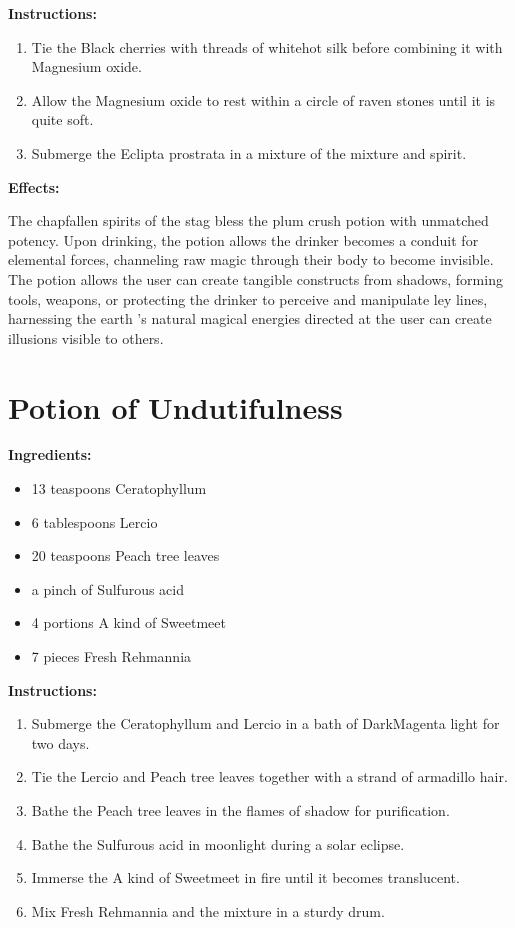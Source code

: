 \documentclass{article}
\begin{document}
\textbf{Instructions:}

\begin{enumerate}
  \item Tie the Black cherries with threads of whitehot silk before combining it with Magnesium oxide.
  \item Allow the Magnesium oxide to rest within a circle of raven stones until it is quite soft.
  \item Submerge the Eclipta prostrata in a mixture of the mixture and spirit.
\end{enumerate}

\textbf{Effects:}

The chapfallen spirits of the stag bless the plum crush potion with unmatched potency. Upon drinking, the potion allows the drinker becomes a conduit for elemental forces, channeling raw magic through their body to become invisible. The potion allows the user can create tangible constructs from shadows, forming tools, weapons, or protecting the drinker to perceive and manipulate ley lines, harnessing the earth 's natural magical energies directed at the user can create illusions visible to others.

\newpage
\section*{Potion of Undutifulness}

\textbf{Ingredients:}

\begin{itemize}
  \item 13 teaspoons Ceratophyllum
  \item 6 tablespoons Lercio
  \item 20 teaspoons Peach tree leaves
  \item a pinch of Sulfurous acid
  \item 4 portions A kind of Sweetmeet
  \item 7 pieces Fresh Rehmannia
\end{itemize}

\textbf{Instructions:}

\begin{enumerate}
  \item Submerge the Ceratophyllum and Lercio in a bath of DarkMagenta light for two days.
  \item Tie the Lercio and Peach tree leaves together with a strand of armadillo hair.
  \item Bathe the Peach tree leaves in the flames of shadow for purification.
  \item Bathe the Sulfurous acid in moonlight during a solar eclipse.
  \item Immerse the A kind of Sweetmeet in fire until it becomes translucent.
  \item Mix Fresh Rehmannia and the mixture in a sturdy drum.
\end{enumerate}
\end{document}
